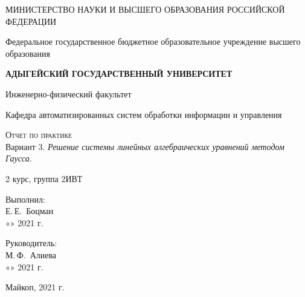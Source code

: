 \documentclass[12pt,a4paper]{scrartcl}
\begin{document}
	\begin{titlepage}
		\begin{center}
			\large
			МИНИСТЕРСТВО НАУКИ И ВЫСШЕГО ОБРАЗОВАНИЯ РОССИЙСКОЙ ФЕДЕРАЦИИ
			
			Федеральное государственное бюджетное образовательное учреждение высшего образования
			
			\textbf{АДЫГЕЙСКИЙ ГОСУДАРСТВЕННЫЙ УНИВЕРСИТЕТ}
			\vspace{0.25cm}
			
			Инженерно-физический факультет
			
			Кафедра автоматизированных систем обработки информации и управления
			\vfill

			\vfill
			
			\textsc{Отчет по практике}\\[5mm]
			
			{\LARGE Вариант 3. \textit{Решение системы линейных алгебраических уравнений методом Гаусса.}}
			\bigskip
			
			2 курс, группа 2ИВТ
		\end{center}
		\vfill
		
		\newlength{\ML}
		\hfill\begin{minipage}{0.5\textwidth}
			Выполнил:\\
			\underline{\hspace{\ML}} Е.\,Е.~Боцман\\
			«\underline{\hspace{0.7cm}}» \underline{\hspace{2cm}} 2021 г.
		\end{minipage}%
		\bigskip
		
		\hfill\begin{minipage}{0.5\textwidth}
			Руководитель:\\
			\underline{\hspace{\ML}} М.\,Ф.~Алиева\\
			«\underline{\hspace{0.7cm}}» \underline{\hspace{2cm}} 2021 г.
		\end{minipage}%
		\vfill
		
		\begin{center}
			Майкоп, 2021 г.
		\end{center}
	\end{titlepage}
\end{document}
